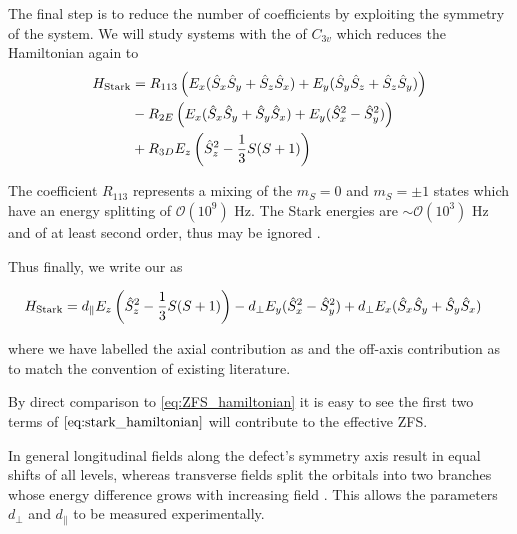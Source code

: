 The final step is to reduce the number of coefficients by exploiting the symmetry of the system. We will study systems with the  of $C_{3v}$ \cite{Davidsson2018} which reduces the Hamiltonian again to \cite{mims}
\begin{equation}
    \begin{align}
        H_{\ce{Stark}} &= R_{113}\left(E_x (\hat{S}_x\hat{S}_y + \hat{S}_z\hat{S}_x) + E_y(\hat{S}_y\hat{S}_z + \hat{S}_z\hat{S}_y) \right) \\ 
                       &- R_{2E} \left(E_x(\hat{S}_x\hat{S}_y + \hat{S}_y\hat{S}_x) + E_y(\hat{S}_x^2 - \hat{S}_y^2   )\right) \\ 
                       &+ R_{3D}E_z\left(\hat{S}_z^2 - \frac{1}{3} S(S+1)\right)
    \end{align}
    \label{eq:}
\end{equation}


The coefficient $R_{113}$ represents a mixing of the $m_S = 0$ and $m_S = \pm 1$ states which have an energy splitting of $\mathcal{O}(10^9)$ Hz. The Stark energies are $\sim \mathcal{O} (10^3)$ Hz and of at least second order, thus may be ignored \cite{VanOort1990}.  

Thus finally, we write our  as 

\begin{equation}
    \begin{align}
        H_{\ce{Stark}} &=
                        d_\parallel E_z\left(\hat{S}_z^2 - \frac{1}{3} S(S+1)\right)
        - d_\perp  E_y(\hat{S}_x^2 - \hat{S}_y^2   ) + d_\perp E_x(\hat{S}_x\hat{S}_y + \hat{S}_y\hat{S}_x)  
    \end{align}
    \label{eq:stark_hamiltonian}
\end{equation}

where we have labelled the axial contribution as  and the off-axis contribution as  to match the convention of existing literature. 

By direct comparison to \eqref{eq:ZFS_hamiltonian} it is easy to see the first two terms of $\eqref{eq:stark_hamiltonian}$ will contribute to the effective ZFS.  

In general longitudinal fields along the defect’s symmetry axis result in equal shifts of all levels, whereas transverse fields split the orbitals into two branches whose energy difference grows with increasing field \cite{Acosta2012, Bassett2011}. This allows the parameters $d_\perp$ and $d_\parallel$ to be measured experimentally. 

